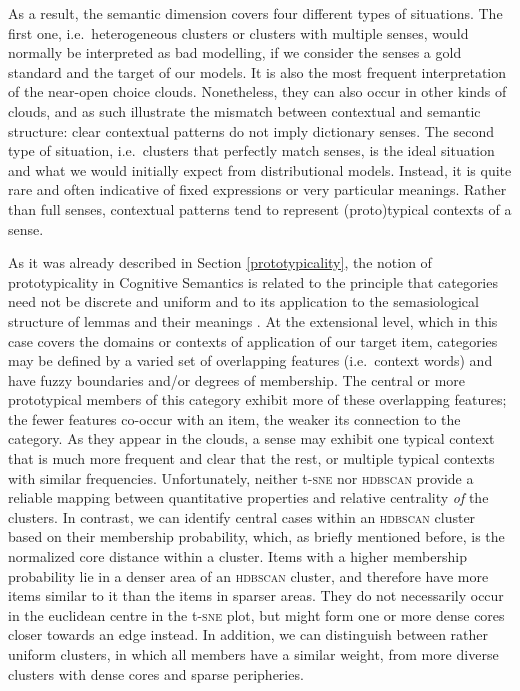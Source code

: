\documentclass[
]{book}
\begin{document}
As a result, the semantic dimension covers four different types of situations. The first one, i.e.~heterogeneous clusters or clusters with multiple senses, would normally be interpreted as bad modelling, if we consider the senses a gold standard and the target of our models. It is also the most frequent interpretation of the near-open choice clouds. Nonetheless, they can also occur in other kinds of clouds, and as such illustrate the mismatch between contextual and semantic structure: clear contextual patterns do not imply dictionary senses.
The second type of situation, i.e.~clusters that perfectly match senses, is the ideal situation and what we would initially expect from distributional models. Instead, it is quite rare and often indicative of fixed expressions or very particular meanings.
Rather than full senses, contextual patterns tend to represent (proto)typical contexts of a sense.

As it was already described in Section \ref{prototypicality}, the notion of prototypicality in Cognitive Semantics is related to the principle that categories need not be discrete and uniform and to its application to the semasiological structure of lemmas and their meanings \autocite{geeraerts_1988,geeraerts_1997}. At the extensional level, which in this case covers the domains or contexts of application of our target item, categories may be defined by a varied set of overlapping features (i.e.~context words) and have fuzzy boundaries and/or degrees of membership. The central or more prototypical members of this category exhibit more of these overlapping features; the fewer features co-occur with an item, the weaker its connection to the category.
As they appear in the clouds, a sense may exhibit one typical context that is much more frequent and clear that the rest, or multiple typical contexts with similar frequencies. Unfortunately, neither t-\textsc{sne} nor \textsc{hdbscan} provide a reliable mapping between quantitative properties and relative centrality \emph{of} the clusters. In contrast, we can identify central cases within an \textsc{hdbscan} cluster based on their membership probability, which, as briefly mentioned before, is the normalized core distance within a cluster. Items with a higher membership probability lie in a denser area of an \textsc{hdbscan} cluster, and therefore have more items similar to it than the items in sparser areas. They do not necessarily occur in the euclidean centre in the t-\textsc{sne} plot, but might form one or more dense cores closer towards an edge instead. In addition, we can distinguish between rather uniform clusters, in which all members have a similar weight, from more diverse clusters with dense cores and sparse peripheries.
\end{document}
